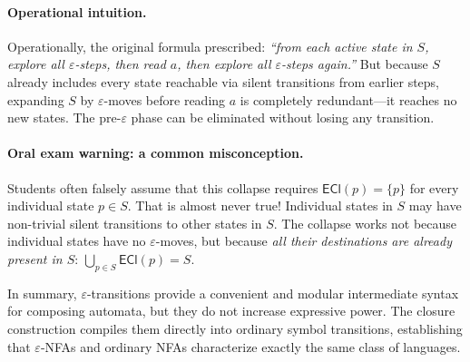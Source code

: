 \begin{formaldetails}
\paragraph{Operational intuition.}
Operationally, the original formula prescribed: \emph{“from each active state in $S$, explore all $\varepsilon$-steps, then read $a$, then explore all $\varepsilon$-steps again.”} But because $S$ already includes every state reachable via silent transitions from earlier steps, expanding $S$ by $\varepsilon$-moves before reading $a$ is completely redundant---it reaches no new states. The pre-$\varepsilon$ phase can be eliminated without losing any transition.

\paragraph{Oral exam warning: a common misconception.}
Students often falsely assume that this collapse requires $\mathsf{ECl}(p) = \{p\}$ for every individual state $p \in S$. That is almost never true! Individual states in $S$ may have non-trivial silent transitions to other states in $S$. The collapse works not because individual states have no $\varepsilon$-moves, but because \emph{all their destinations are already present in $S$}: $\bigcup_{p\in S}\mathsf{ECl}(p) = S$.
\end{formaldetails}

\medskip\noindent
In summary, $\varepsilon$-transitions provide a convenient and modular intermediate syntax for composing automata, but they do not increase expressive power. The closure construction compiles them directly into ordinary symbol transitions, establishing that $\varepsilon$-NFAs and ordinary NFAs characterize exactly the same class of languages.


